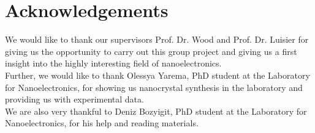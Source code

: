 \chapter*{Acknowledgements}

We would like to thank our supervisors Prof. Dr. Wood and Prof. Dr. Luisier for giving us the opportunity to carry out this group project and giving us a first insight into the highly interesting field of nanoelectronics. \\

Further, we would like to thank Olessya Yarema, PhD student at the Laboratory for Nanoelectronics, for showing us nanocrystal synthesis in the laboratory and providing us with experimental data.\\
 
We are also very thankful to Deniz Bozyigit, PhD student at the Laboratory for Nanoelectronics, for his help and reading materials.